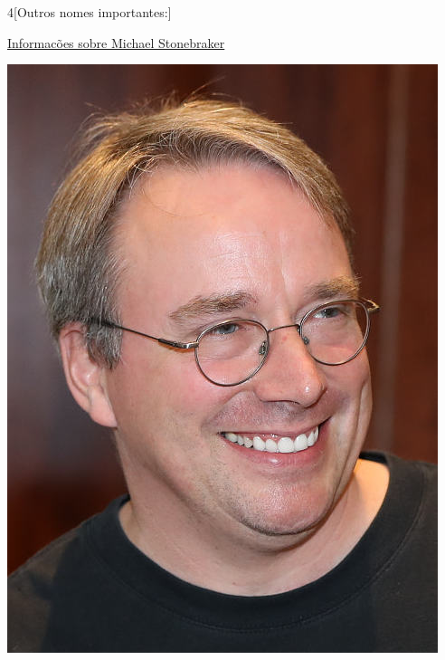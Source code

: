 \begin{multicols}{4}[Outros nomes importantes:]
\vfill\null

\columnbreak				
				
				\href{https://pt.wikipedia.org/wiki/Michael_Stonebraker}{Informacões sobre Michael Stonebraker}
				
\begin{center}
					\includegraphics[width=.8\columnwidth]{./IMG-GIT/CIENTISTAS/linus.jpeg}
\end{center}
				
\vfill\null

\pagebreak
				
\end{multicols}
